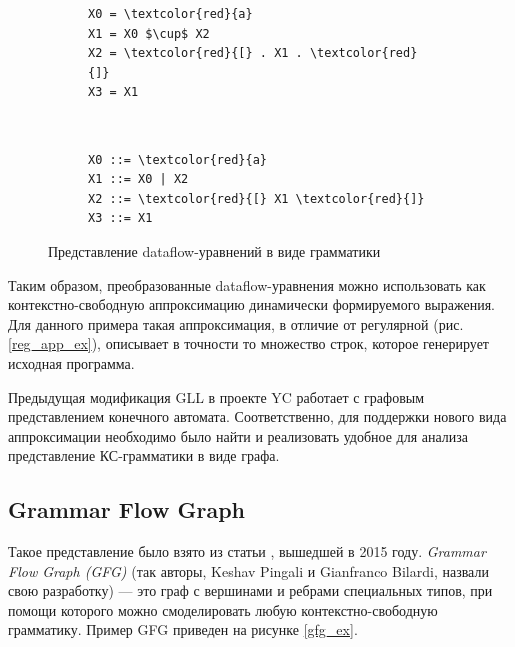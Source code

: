 \documentclass[14pt]{matmex-diploma-custom}
\begin{document}
\begin{figure}[h]
    \centering
	\begin{subfigure}{0.4\textwidth}
	    \centering
	    \begin{minipage}{4cm}
		    \begin{Verbatim}[commandchars=\\\{\}, codes={\catcode`$=3}]
X0 = \textcolor{red}{a} 
X1 = X0 $\cup$ X2
X2 = \textcolor{red}{[} . X1 . \textcolor{red}{]}
X3 = X1 
		    \end{Verbatim}
		\end{minipage}
	\end{subfigure}
	~
	\begin{subfigure}{0.4\textwidth}
	\centering
	    \begin{minipage}{4cm}
		    \begin{Verbatim}[commandchars=\\\{\}]
X0 ::= \textcolor{red}{a}
X1 ::= X0 | X2
X2 ::= \textcolor{red}{[} X1 \textcolor{red}{]} 
X3 ::= X1
		    \end{Verbatim}
		\end{minipage}	
	\end{subfigure}
	\caption{Представление dataflow-уравнений в виде грамматики}
	\label{eq_gram}
\end{figure}

Таким образом, преобразованные dataflow-уравнения можно использовать как контекстно-свободную аппроксимацию динамически формируемого выражения. Для данного примера такая аппроксимация, в отличие от регулярной (рис. \ref{reg_app_ex}), описывает в точности то множество строк, которое генерирует исходная программа.

Предыдущая модификация GLL в проекте YC работает с графовым представлением конечного автомата. Соответственно, для поддержки нового вида аппроксимации необходимо было найти и реализовать удобное для анализа представление КС-грамматики в виде графа.  

\subsection{Grammar Flow Graph}
Такое представление было взято из статьи \cite{gfg}, вышедшей в 2015 году. \textit{Grammar Flow Graph (GFG)} (так авторы, Keshav Pingali и Gianfranco Bilardi, назвали свою разработку) --- это граф с вершинами и ребрами специальных типов, при помощи которого можно смоделировать любую контекстно-свободную грамматику. Пример GFG приведен на рисунке \ref{gfg_ex}. 
\end{document}
